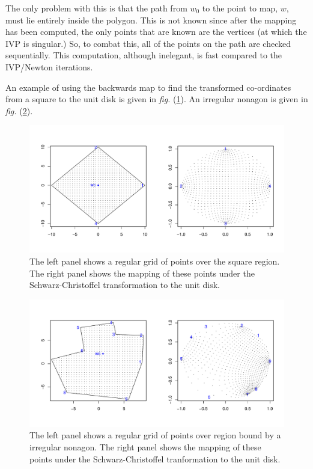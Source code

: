 \documentclass[a4paper,10pt]{amsart}
\newcommand{\sch}{Schwarz-Christoffel }
\newcommand{\fig}[1]{\emph{fig.} (\ref{#1})}
\begin{document}
The only problem with this is that the path from $w_0$ to the point to map, $w$, must lie entirely inside the polygon. This is not known since after the mapping has been computed, the only points that are known are the vertices (at which the IVP is singular.) So, to combat this, all of the points on the path are checked sequentially. This computation, although inelegant, is fast compared to the IVP/Newton iterations.

An example of using the backwards map to find the transformed co-ordinates from a square to the unit disk is given in \fig{squaredomain}. An irregular nonagon is given in \fig{irregdomain}.


\begin{figure} [bp]
\centering
\includegraphics[scale=0.5]{figs/squaredomain.pdf}
\caption{The left panel shows a regular grid of points over the square region. The right panel shows the mapping of these points under the \sch transformation to the unit disk.}
\label{squaredomain}
\end{figure}

\begin{figure} [tbp]
\centering
\includegraphics[scale=0.5]{figs/irregulardomain.pdf}
\caption{The left panel shows a regular grid of points over region bound by a irregular nonagon. The right panel shows the mapping of these points under the \sch tranformation to the unit disk.}
\label{irregdomain}
\end{figure}
\end{document}
